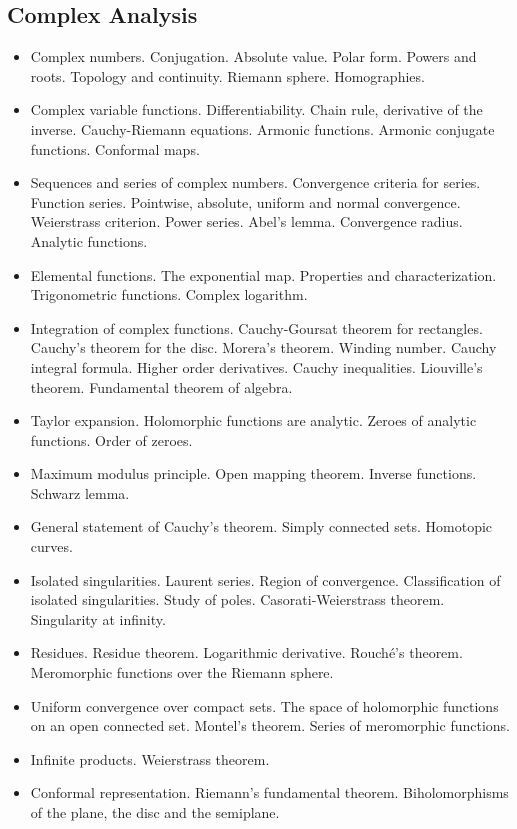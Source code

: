\documentclass[spanish]{article}
\begin{document}
\hrulefill%

\subsection{Complex Analysis}

\begin{itemize}
  \item
Complex numbers. Conjugation. Absolute value. Polar form. Powers and roots. Topology
and continuity. Riemann sphere. Homographies.

  \item
Complex variable functions. Differentiability. Chain rule, derivative of the inverse.
Cauchy-Riemann equations. Armonic functions. Armonic conjugate functions. Conformal maps.

  \item
Sequences and series of complex numbers. Convergence criteria for series.
Function series. Pointwise, absolute, uniform and normal convergence. Weierstrass criterion.
Power series. Abel's lemma. Convergence radius. Analytic functions.

  \item
Elemental functions. The exponential map. Properties and characterization. Trigonometric
functions. Complex logarithm.

  \item
Integration of complex functions. Cauchy-Goursat theorem for rectangles. Cauchy's theorem
for the disc. Morera's theorem. Winding number. Cauchy integral formula. Higher order derivatives.
Cauchy inequalities. Liouville's theorem. Fundamental theorem of algebra.

  \item
Taylor expansion. Holomorphic functions are analytic. Zeroes of analytic functions.
Order of zeroes.

  \item
Maximum modulus principle. Open mapping theorem. Inverse functions. Schwarz lemma.

  \item
General statement of Cauchy's theorem. Simply connected sets. Homotopic curves.

  \item
Isolated singularities. Laurent series. Region of convergence. Classification of
isolated singularities. Study of poles. Casorati-Weierstrass theorem. Singularity
at infinity.

  \item
Residues. Residue theorem. Logarithmic derivative. Rouch\'e's theorem.
Meromorphic functions over the Riemann sphere.

  \item
Uniform convergence over compact sets. The space of holomorphic functions on an
open connected set. Montel's theorem. Series of meromorphic functions.

  \item
Infinite products. Weierstrass theorem.

  \item
Conformal representation. Riemann's fundamental theorem. Biholomorphisms of the
plane, the disc and the semiplane.
\end{itemize}
\end{document}
